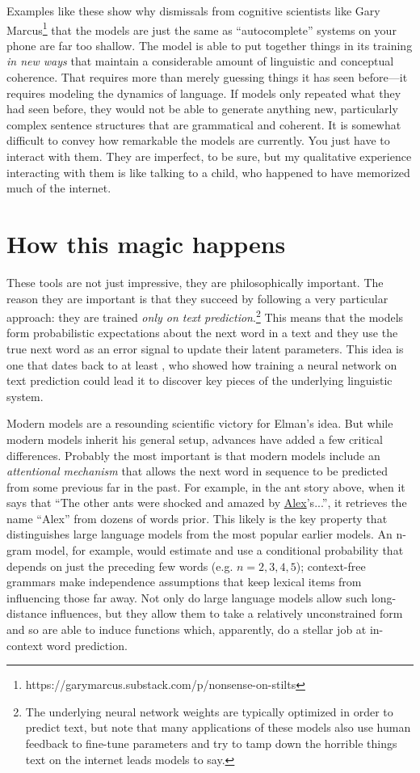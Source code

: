 \documentclass[output=paper,colorlinks,citecolor=brown
]{langscibook}
\begin{document}
Examples like these show why dismissals from cognitive scientists like Gary Marcus\footnote{ https://garymarcus.substack.com/p/nonsense-on-stilts} that the models are just the same as ``autocomplete'' systems on your phone are far too shallow. The model is able to put together things in its training \emph{in new ways} that maintain a considerable amount of linguistic and conceptual coherence. That requires more than merely guessing things it has seen before---it requires modeling the dynamics of language. If models only repeated what they had seen before, they would not be able to generate anything new, particularly complex sentence structures that are grammatical and coherent. It is somewhat difficult to convey how remarkable the models are currently. You just have to interact with them. They are imperfect, to be sure, but my qualitative experience interacting with them is like talking to a child, who happened to have memorized much of the internet. 

\section{How this magic happens}

These tools are not just impressive, they are philosophically important. The reason they are important is that they succeed by following a very particular approach: they are trained \emph{only on text prediction}.\footnote{The underlying neural network weights are typically optimized in order to predict text, but note that many applications of these models also use human feedback to fine-tune parameters and try to tamp down the horrible things text on the internet leads models to say.} This means that the models form probabilistic expectations about the next word in a text and they use the true next word as an error signal to update their latent parameters. This idea is one that dates back to at least \cite{elman1990finding}, who showed how training a neural network on text prediction could lead it to discover key pieces of the underlying linguistic system. 

Modern models are a resounding scientific victory for Elman's idea. But while modern models inherit his general setup, advances have added a few critical differences. Probably the most important is that modern models include an \emph{attentional mechanism} that allows the next word in sequence to be predicted from some previous far in the past. For example, in the ant story above,  when it says that ``The other ants were shocked and amazed by \underline{Alex}'s...'', it retrieves the name ``Alex'' from dozens of words prior. This likely is the key property that distinguishes large language models from the most popular earlier  models. An n-gram model, for example, would estimate and use a conditional probability that depends on just the preceding few words (e.g. $n=2,3,4,5$); context-free grammars make independence assumptions that keep lexical items from influencing those far away. Not only do large language models allow such long-distance influences, but they allow them to take a relatively unconstrained form and so are able to induce functions which, apparently, do a stellar job at in-context word prediction. 
\end{document}
